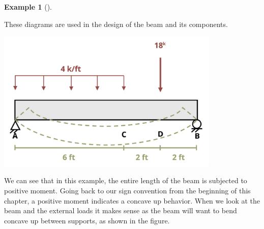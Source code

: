 \documentclass[
  letterpaper,
  DIV=11,
  numbers=noendperiod]{scrreprt}
\theoremstyle{definition}
\newtheorem{example}{Example}[chapter]
\theoremstyle{remark}
\begin{document}
\begin{tcolorbox}
\begin{example}[]
\begin{tcolorbox}
These diagrams are used in the design of the beam and its components.

\begin{center}
\includegraphics[width=4.1875in,height=\textheight]{images/CH7 PNGs/example 7.2 part 10.png}
\end{center}

We can see that in this example, the entire length of the beam is
subjected to positive moment. Going back to our sign convention from the
beginning of this chapter, a positive moment indicates a concave up
behavior. When we look at the beam and the external loads it makes sense
as the beam will want to bend concave up between supports, as shown in
the figure.

\end{tcolorbox}

\end{example}

\end{tcolorbox}
\end{document}
